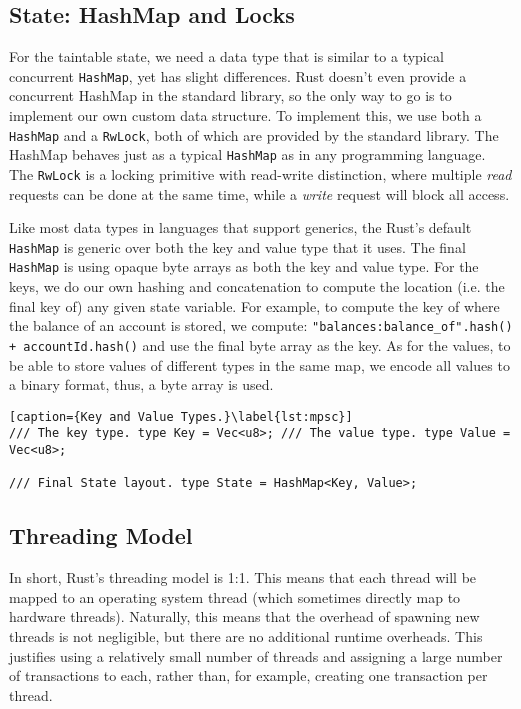\subsection{State: HashMap and Locks} \label{chap:impl:subsec:state_and_concurrent_map}

For the taintable state, we need a data type that is similar to a typical concurrent
\texttt{HashMap}\cite{barnatFastDynamicallySizedConcurrent2015}, yet has slight differences. Rust
doesn't even provide a concurrent HashMap in the standard library, so the only way to go is to
implement our own custom data structure. To implement this, we use both a \texttt{HashMap} and a
\texttt{RwLock}, both of which are provided by the standard library. The HashMap behaves just as a
typical \texttt{HashMap} as in any programming language. The \texttt{RwLock} is a locking primitive
with read-write distinction, where multiple \textit{read} requests can be done at the same time,
while a \textit{write} request will block all access.

Like most data types in languages that support generics, the Rust's default \texttt{HashMap} is
generic over both the key and value type that it uses. The final \texttt{HashMap} is using opaque
byte arrays as both the key and value type. For the keys, we do our own hashing and concatenation to
compute the location (i.e. the final key of) any given state variable. For example, to compute the
key of where the balance of an account is stored, we compute: \texttt{"balances:balance\_of".hash()
+ accountId.hash()} and use the final byte array as the key. As for the values, to be able to store
values of different types in the same map, we encode all values to a binary format, thus, a byte
array is used.

\begin{lstlisting}[caption={Key and Value Types.}\label{lst:mpsc}]
/// The key type. type Key = Vec<u8>; /// The value type. type Value = Vec<u8>;

/// Final State layout. type State = HashMap<Key, Value>;
\end{lstlisting}

\subsection{Threading Model}

In short, Rust's threading model is 1:1. This means that each thread will be mapped to an operating
system thread (which sometimes directly map to hardware threads). Naturally, this means that the
overhead of spawning new threads is not negligible, but there are no additional runtime overheads.
This justifies using a relatively small number of threads and assigning a large number of
transactions to each, rather than, for example, creating one transaction per thread.

